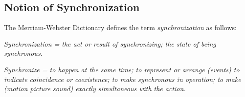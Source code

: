 %	
%	
%	
%	
	
\subsection{Notion of Synchronization}\label{sec:notion-of-synchronization}
The Merriam-Webster Dictionary defines the term \textit{synchronization} as follows:

\textit{Synchronization = the act or result of synchronizing; the state of being synchronous.}

\textit{Synchronize = to happen at the same time; to represent or arrange (events) to indicate coincidence or coexistence; to make synchronous in operation; to make (motion picture sound) exactly simultaneous with the action.}	

